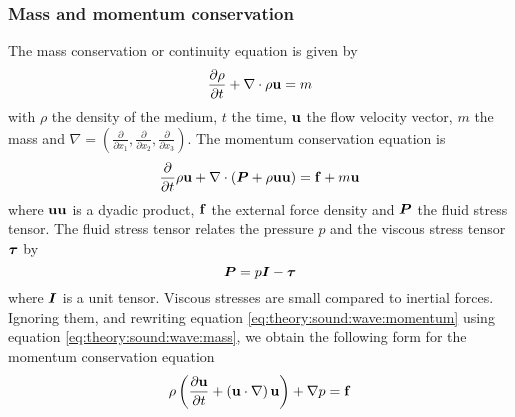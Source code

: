 \subsubsection*{Mass and momentum conservation}
The mass conservation or continuity equation is given by
\begin{equation}\label{eq:theory:sound:wave:mass}
 \frac{\partial \rho}{\partial t} + \nabla \cdot \rho \mathbf{u} = m
\end{equation}
with $\rho$ the density of the medium, $t$ the time, $\mathbf{u}$ the flow velocity
vector, $m$ the mass and $\nabla = \left( \frac{\partial}{\partial
x_1},\frac{\partial}{\partial x_2},\frac{\partial}{\partial x_3} \right)$.
The momentum conservation equation is
\begin{equation}\label{eq:theory:sound:wave:momentum}
 \frac{\partial}{\partial t} \rho \mathbf{u} + \nabla \cdot \left(\bm{P} + \rho \mathbf{u} \mathbf{u}  \right) = \mathbf{f} + m \mathbf{u}
\end{equation}
where $\mathbf{u} \mathbf{u}$ is a dyadic product, $\mathbf{f}$ the external force
density and $\bm{P}$ the fluid stress tensor. The fluid stress tensor relates the pressure $p$ and the viscous stress tensor $\bm{\tau}$ by
\begin{equation}
  \bm{P} = p \bm{I} - \bm{\tau}
\end{equation}
where $\bm{I}$ is a unit tensor. Viscous stresses are small compared to inertial
forces. Ignoring them, and rewriting equation
\ref{eq:theory:sound:wave:momentum} using equation
\ref{eq:theory:sound:wave:mass}, we obtain the following form for the momentum conservation equation
\begin{equation}
 \rho \left( \frac{\partial \mathbf{u}}{\partial t} + \left( \mathbf{u} \cdot \nabla \right) \mathbf{u} \right) + \nabla p = \mathbf{f}
\end{equation}
